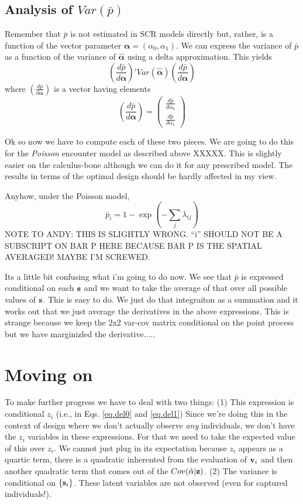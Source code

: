 \documentclass[useAMS,referee]{biom}
\begin{document}
\subsection*{Analysis of $Var(\bar{p})$}
Remember that $\bar{p}$ is not estimated in SCR models directly but,
rather, is a function of the vector parameter ${\bm \alpha} =
(\alpha_{0},\alpha_{1})$. We can express the variance of $\bar{p}$ as
a function of the variance of $\hat{\bm \alpha}$ using a delta
approximation. This yields
\[
\left( \frac{d \bar{p}}{d {\bm \alpha} } \right)'  Var(\hat{\bm
  \alpha})
\left( \frac{d \bar{p}}{d {\bm \alpha} } \right)
\]
where
$\left( \frac{d \bar{p}}{d {\bm \alpha} } \right)$ is a vector having
elements
\[
\left( \frac{d \bar{p}}{d {\bm \alpha} } \right)  =   \left(
\begin{array}{c}
\frac{d \bar{p}}{d \alpha_{0} } \\
\frac{d \bar{p}}{d \alpha_{1} }
\end{array}
\right)
\]

Ok so now we have to compute each of these two pieces.  We are going
to do this for the {\it Poisson} encounter model as described above
XXXXX. This is slightly easier on the calculus-bone although we can do
it for any prescribed model. The results in terms of the optimal
design should be hardly affected in my view. 

Anyhow, under the Poisson model,
\[
\bar{p}_{i} = 1-\exp(-\sum_{j} \lambda_{ij})
\]
NOTE TO ANDY: THIS IS SLIGHTLY WRONG. ``i'' SHOULD NOT BE A SUBSCRIPT
ON BAR P HERE BECAUSE BAR P IS THE SPATIAL AVERAGED!  MAYBE I'M
SCREWED. 

Its a little bit confusing what i'm going to do now. We see that
$\bar{p}$ is expressed conditional on each ${\bf s}$ and we want to
take the average of that over all possible values of ${\bf s}$. This
is easy to do. We just do that integraiton as a summation and it works
out that we just average the derivatives in the above expressions. 
This is strange because we keep the 2x2 var-cov matrix conditional on
the point process but we have marginizled the derivative.....


\section{Moving on}


To make further progress we have to deal with 
two 
things: (1) This expression is conditional $z_{i}$ (i.e., in Eqs. \ref{eq.del0}
and \ref{eq.del1}) 
Since we're doing this in the context of design where we don't
actually observe {\it any} individuals, we don't have the $z_{i}$
variables in these expressions. For that we need to take the expected
value of this over $z_{i}$. We cannot just plug in its 
expectation because $z_{i}$ appears as a quartic term, there is  a
quadratic inherented from the evaluation of ${\bf v}_{i}$ and then
another quadratic term that comes out of the $Cov(\hat{\alpha}|{\bf
  z})$. 
(2) The variance is conditional on $\{ {\bf s}_{i} \}$. These latent
variables are not observed (even for captured individuals!). 
\end{document}
